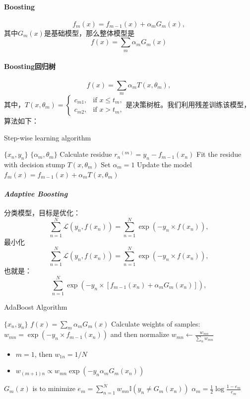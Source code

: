 \paragraph{Boosting}
$$f_m(x) = f_{m-1}(x) + \alpha_mG_m(x),$$
其中$G_m(x)$是基础模型，那么整体模型是
$$f(x) = \sum_m \alpha_m G_m(x)$$

\paragraph{Boosting回归树}
$$f(x) = \sum_m \alpha_m T(x, \theta_m),$$
其中，$T(x,\theta_m)=\left\{\begin{array}{ll}
    c_{m1}, & \text{if }x \le t_m, \\
    c_{m2}, & \text{if }x > t_m,
\end{array} \right.$是决策树桩。我们利用残差训练该模型，算法如下：
\begin{algorithm}[H]
\caption{Step-wise learning algorithm}
\label{alg:step-wise}
\begin{algorithmic}[1]
\Require $\{x_n, y_n\}$
\Ensure $\{\alpha_m, \theta_m\}$
\State Calculate residue ${r_n}^{(m)} = y_n - f_{m-1}(x_n)$
\State Fit the residue with decision stump $T(x,\theta_m)$
\State Set $\alpha_m = 1$
\State Update the model $f_m(x) = f_{m-1}(x) + \alpha_mT(x, \theta_m)$
\EndFor
\end{algorithmic}
\end{algorithm}

\paragraph{\textit{Adaptive Boosting}}
分类模型，目标是优化：
$$\sum_{n=1}^N \mathcal{L}(y_n, f(x_n)) = \sum_{n=1}^N \exp(-y_n \times f(x_n)),$$
最小化$$\sum^N_{n=1} \mathcal{L}(y_n, f(x_n)) = \sum_{n=1}^N \exp(-y_n \times f(x_n)),$$也就是：
$$
\sum_{n=1}^N \exp(-y_n \times [f_{m-1}(x_n) + \alpha_mG_m(x_n)]),
$$

\begin{algorithm}[H]
\caption{AdaBoost Algorithm}
\label{alg:AdaBoost}
\begin{algorithmic}[1]
\Require $\{x_n, y_n\}$
\Ensure $f(x) = \sum_m \alpha_mG_m(x)$
\State Calculate weights of samples: $w_{mn} = \exp(-y_n \times f_{m-1}(x_n))$ and then
normalize $w_{mn} \leftarrow \frac{w_{mn}}{\sum_n w_{mn}}$\begin{itemize}
    \item $m=1$, then $w_{1n} = 1/N$
    \item $w_{(m+1)n} \propto w_{mn}\exp(-y_n\alpha_mG_m(x_n))$
\end{itemize}
\State $G_m(x)$ is to minimize $e_m = \sum_{n=1}^N w_{mn}\mathbb{I}(y_n \neq G_m(x_n))$
\State $\alpha_m = \frac{1}{2} \log \frac{1-e_m}{e_m}$
\EndFor
\end{algorithmic}
\end{algorithm}

